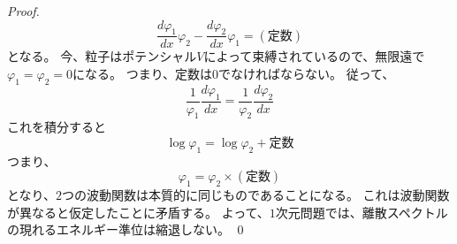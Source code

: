 \begin{proof}
\begin{equation}
		\dfrac{d\varphi_1}{dx}\varphi_2 - \dfrac{d\varphi_2}{dx}\varphi_1 = (定数)
	\end{equation}
	となる。
	今、粒子はポテンシャル$V$によって束縛されているので、無限遠で$\varphi_1 = \varphi_2 = 0$になる。
	つまり、定数は$0$でなければならない。
	従って、
	\begin{equation}
		\dfrac{1}{\varphi_1}\dfrac{d\varphi_1}{dx} = \dfrac{1}{\varphi_2}\dfrac{d \varphi_2}{dx}
	\end{equation}
	これを積分すると
	\begin{equation}
		\log\varphi_1 = \log\varphi_2 + 定数
	\end{equation}
	つまり、
	\begin{equation}
		\varphi_1 = \varphi_2 \times (定数)
	\end{equation}
	となり、$2$つの波動関数は本質的に同じものであることになる。
	これは波動関数が異なると仮定したことに矛盾する。
	よって、$1$次元問題では、離散スペクトルの現れるエネルギー準位は縮退しない。
	\qed
\end{proof}
